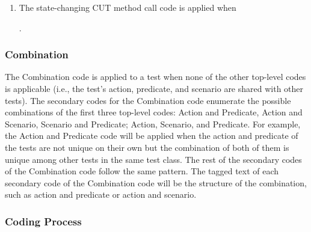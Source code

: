 \documentclass[proposal.tex]{subfiles}
\begin{document}
\begin{enumerate}
.
    \item The state-changing CUT method call code is applied when
    .
\end{enumerate}

\subsubsection{Combination}

The Combination code is applied to a test when none of the other top-level codes is applicable (i.e., the test’s action, predicate, and scenario are shared with other tests).
%
The secondary codes for the Combination code enumerate the possible combinations of the first three top-level codes: Action and Predicate, Action and Scenario, Scenario and Predicate; Action, Scenario, and Predicate.
%
For example, the Action and Predicate code will be applied when the action and predicate of the tests are not unique on their own but the combination of both of them is unique among other tests in the same test class.
%
The rest of the secondary codes of the Combination code follow the same pattern. The tagged text of each secondary code of the Combination code will be the structure of the combination, such as action and predicate or action and scenario.

\subsubsection{Coding Process}
\end{document}
